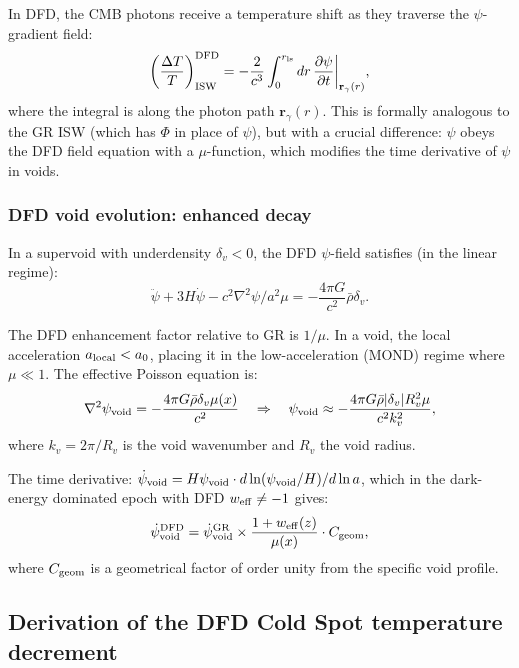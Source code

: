 \documentclass[11pt]{article}
\newcommand{\mufd}{\mu}
\newcommand{\eff}{{\rm eff}}
\newcommand{\DFD}{{\rm DFD}}
\begin{document}
In DFD, the CMB photons receive a temperature shift as they traverse
the $\psi$-gradient field:
\begin{equation}\label{eq:isw-dfd}
  \left(\frac{\Delta T}{T}\right)_{\rm ISW}^{\rm DFD}
  = -\frac{2}{c^3}\int_0^{r_{\rm ls}} dr\,
  \frac{\partial\psi}{\partial t}\bigg|_{\mathbf{r}_\gamma(r)},
\end{equation}
where the integral is along the photon path $\mathbf{r}_\gamma(r)$.
This is formally analogous to the GR ISW (which has $\Phi$ in place of $\psi$),
but with a crucial difference: $\psi$ obeys the DFD field equation with
a $\mu$-function, which modifies the time derivative of $\psi$ in voids.

\subsubsection{DFD void evolution: enhanced decay}

In a supervoid with underdensity $\delta_v < 0$, the DFD $\psi$-field
satisfies (in the linear regime):
\begin{equation}\label{eq:psi-void}
  \ddot\psi + 3H\dot\psi - c^2\nabla^2\psi/a^2\mufd
  = -\frac{4\pi G}{c^2}\bar\rho\delta_v.
\end{equation}

The DFD enhancement factor relative to GR is $1/\mufd$.  In a void,
the local acceleration $a_{\rm local} < a_0$, placing it in the
low-acceleration (MOND) regime where $\mufd \ll 1$.  The effective
Poisson equation is:
\begin{equation}
  \nabla^2\psi_{\rm void} = -\frac{4\pi G\bar\rho\delta_v\mufd(x)}{c^2}
  \quad\Rightarrow\quad
  \psi_{\rm void} \approx -\frac{4\pi G\bar\rho|\delta_v|R_v^2\mufd}{c^2 k_v^2},
\end{equation}
where $k_v = 2\pi/R_v$ is the void wavenumber and $R_v$ the void radius.

The time derivative: $\dot\psi_{\rm void} = H\psi_{\rm void}\cdot
d\ln(\psi_{\rm void}/H)/d\ln a$, which in the dark-energy dominated
epoch with DFD $w_\eff \neq -1$ gives:
\begin{equation}
  \dot\psi_{\rm void}^\DFD = \dot\psi_{\rm void}^{\rm GR}\times
  \frac{1 + w_\eff(z)}{\mufd(x)}\cdot C_{\rm geom},
\end{equation}
where $C_{\rm geom}$ is a geometrical factor of order unity from the
specific void profile.

\subsection{Derivation of the DFD Cold Spot temperature decrement}
\end{document}
